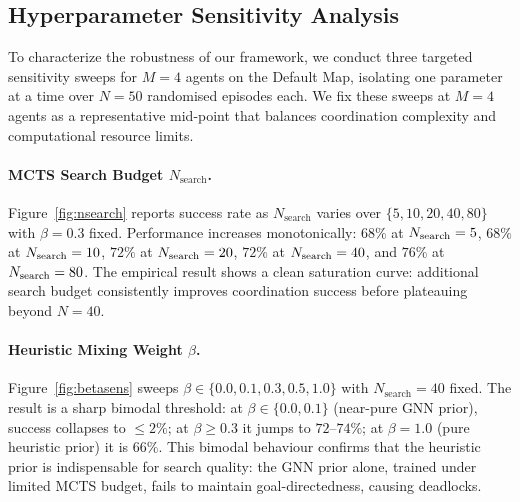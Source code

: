 \documentclass[11pt,a4paper]{article}
\begin{document}
\subsection{Hyperparameter Sensitivity Analysis}\label{sec:sensitivity}
To characterize the robustness of our framework, we conduct three targeted sensitivity sweeps for $M=4$ agents on the Default Map, isolating one parameter at a time over $N=50$ randomised episodes each. We fix these sweeps at $M=4$ agents as a representative mid-point that balances coordination complexity and computational resource limits.

\paragraph{MCTS Search Budget $N_{\mathrm{search}}$.}
Figure~\ref{fig:nsearch} reports success rate as $N_{\mathrm{search}}$ varies over $\{5, 10, 20, 40, 80\}$ with $\beta=0.3$ fixed. Performance increases monotonically: $68\%$ at $N_{\rm search}=5$, $68\%$ at $N_{\rm search}=10$, $72\%$ at $N_{\rm search}=20$, $72\%$ at $N_{\rm search}=40$, and $76\%$ at $N_{\rm search}=80$. The empirical result shows a clean saturation curve: additional search budget consistently improves coordination success before plateauing beyond $N=40$.

\paragraph{Heuristic Mixing Weight $\beta$.}
Figure~\ref{fig:betasens} sweeps $\beta \in \{0.0, 0.1, 0.3, 0.5, 1.0\}$ with $N_{\mathrm{search}}=40$ fixed. The result is a sharp bimodal threshold: at $\beta \in \{0.0, 0.1\}$ (near-pure GNN prior), success collapses to $\le 2\%$; at $\beta \ge 0.3$ it jumps to $72$--$74\%$; at $\beta=1.0$ (pure heuristic prior) it is $66\%$. This bimodal behaviour confirms that the heuristic prior is indispensable for search quality: the GNN prior alone, trained under limited MCTS budget, fails to maintain goal-directedness, causing deadlocks.
\end{document}
